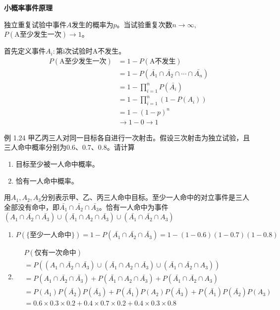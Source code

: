 \documentclass{beamer}
\begin{document}
	\begin{frame}
		\textbf{小概率事件原理}
		
		 独立重复试验中事件$A$发生的概率为$p$。当试验重复次数$n\rightarrow \infty$,$P(\text{A至少发生一次}) \rightarrow 1$。
		 
		 \vspace*{1cm}
		 首先定义事件$A_i: \text{第i次试验时A不发生。}$
		 \begin{align}
		 	P(\text{A至少发生一次}) & = 1 - P(\text{A不发生}) \\
		 	& = 1 - P(\bar{A_1} \cap \bar{A_2} \cap \cdots \cap \bar{A_n}) \\
		 	& = 1 - \prod_{i = 1}^{n} P(\bar{A_i}) \\
		 	& = 1 - \prod_{i = 1}^{n}(1 - P(A_i)) \\
		 	& = 1 - (1 - p)^n \\
		 	& \rightarrow 1 - 0 \rightarrow 1 
		 \end{align}
	\end{frame}
	
	\begin{frame}
		例 1.24 甲乙丙三人对同一目标各自进行一次射击。假设三次射击为独立试验，且三人命中概率分别为0.6、0.7、0.8。请计算
		\begin{enumerate}
			\item 目标至少被一人命中概率。
			\item 恰有一人命中概率。
		\end{enumerate}
	\end{frame}
	
	\begin{frame}
		用$A_1, A_2, A_3$分别表示甲、乙、丙三人命中目标。至少一人命中的对立事件是三人全部没有命中，即$\bar{A_1} \cap \bar{A_2} \cap \bar{A_3}$。恰有一人命中为事件$(A_1 \cap \bar{A_2} \cap \bar{A_3}) \cup (\bar{A_1} \cap A_2 \cap \bar{A_3}) \cup (\bar{A_1} \cap \bar{A_2} \cap A_3)$
		\begin{enumerate}
			\item $P(\{\text{至少一人命中}\}) = 1 - P(\bar{A_1} \cap \bar{A_2} \cap \bar{A_3}) = 1 - ( 1 - 0.6)(1 - 0.7)(1 - 0.8)$
			\item \begin{align}
				&P(\text{仅有一次命中}) \\
				& = P((A_1 \cap \bar{A_2} \cap \bar{A_3}) \cup (\bar{A_1} \cap A_2 \cap \bar{A_3}) \cup (\bar{A_1} \cap \bar{A_2} \cap A_3)) \\ 
				& = P(A_1 \cap \bar{A_2} \cap \bar{A_3}) + P(\bar{A_1} \cap A_2 \cap \bar{A_3}) + P(\bar{A_1} \cap \bar{A_2} \cap A_3) \\
				& = P(A_1) P(\bar{A_2}) P(\bar{A_3}) + P(\bar{A_1}) P(A_2) P(\bar{A_3}) + P(\bar{A_1}) P(\bar{A_2}) P(A_3) \\
				& = 0.6 \times 0.3 \times 0.2 + 0.4 \times 0.7 \times 0.2 + 0.4 \times 0.3 \times 0.8
			\end{align}
		\end{enumerate}
	\end{frame}
	
\end{document}
